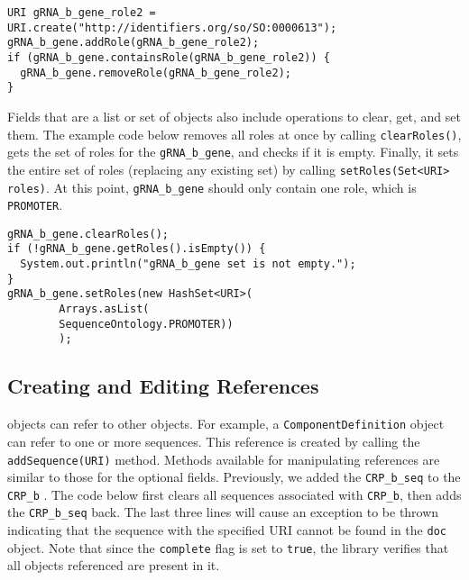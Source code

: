 \vspace{\abovedisplayskip}
\begin{minipage}{0.95\textwidth} 
\begin{lstlisting}
URI gRNA_b_gene_role2 = URI.create("http://identifiers.org/so/SO:0000613"); 
gRNA_b_gene.addRole(gRNA_b_gene_role2);
if (gRNA_b_gene.containsRole(gRNA_b_gene_role2)) {
  gRNA_b_gene.removeRole(gRNA_b_gene_role2);
}
\end{lstlisting}
\end{minipage}

Fields that are a list or set of objects also include operations to clear, get, and set them.  The example code below removes all roles at once by calling \lstinline+clearRoles()+, gets the set of roles for the \lstinline+gRNA_b_gene+, and checks if it is empty.   Finally, it sets the entire set of roles (replacing any existing set) by calling \lstinline+setRoles(Set<URI> roles)+. At this point, \lstinline+gRNA_b_gene+ should only contain one role, which is \lstinline+PROMOTER+.

\vspace{\abovedisplayskip}
\begin{minipage}{0.95\textwidth} 
\begin{lstlisting}
gRNA_b_gene.clearRoles();
if (!gRNA_b_gene.getRoles().isEmpty()) {
  System.out.println("gRNA_b_gene set is not empty.");
}
gRNA_b_gene.setRoles(new HashSet<URI>(
        Arrays.asList(
        SequenceOntology.PROMOTER))
        );
 \end{lstlisting}
\end{minipage}

\subsection*{Creating and Editing References}
 objects can refer to other  objects.  For example, 
a \lstinline+ComponentDefinition+ object can refer to one or more sequences.  This reference is created by calling the \lstinline+addSequence(URI)+ method.  Methods available for manipulating references are similar to those for the optional fields. Previously, we added the \lstinline+CRP_b_seq+  to the \lstinline+CRP_b+ . The code below first clears all sequences associated with \lstinline+CRP_b+,  then adds the \lstinline+CRP_b_seq+  back. The last three lines will cause an exception to be thrown indicating that the sequence with the specified URI cannot be found in the \lstinline+doc+  object. Note that since the \lstinline+complete+ flag is set to \lstinline+true+, the library verifies that all objects referenced are present in it.

